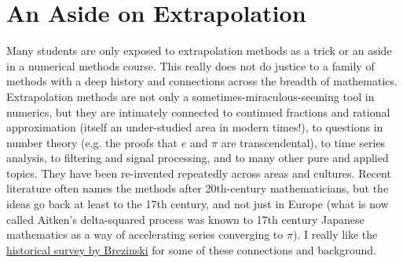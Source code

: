 \documentclass[12pt, leqno]{article}
\begin{document}
\section{An Aside on Extrapolation}

Many students are only exposed to extrapolation methods as a trick or
an aside in a numerical methods course.  This really does not do
justice to a family of methods with a deep history and connections
across the breadth of mathematics.  Extrapolation methods are not only
a sometimes-miraculous-seeming tool in numerics, but they are
intimately connected to continued fractions and rational approximation
(itself an under-studied area in modern times!), to questions in
number theory (e.g. the proofs that $e$ and $\pi$ are transcendental),
to time series analysis, to filtering and signal processing, and to
many other pure and applied topics.  They have been re-invented
repeatedly across areas and cultures.  Recent literature often names
the methods after 20th-century mathematicians, but the ideas go back
at least to the 17th century, and not just in Europe (what is now
called Aitken's delta-squared process was known to 17th century
Japanese mathematics as a way of accelerating series converging to
$\pi$).  I really like the
\href{https://doi.org/10.1016/0168-9274(95)00110-7}{historical survey by Brezinski}
for some of these connections and background.
\end{document}
